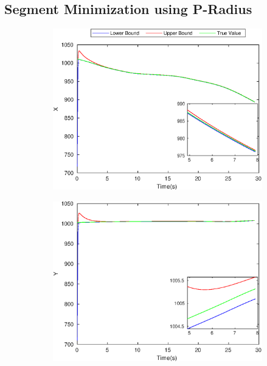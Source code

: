 \subsection{Segment Minimization using P-Radius}
\begin{figure}[h]
\begin{subfigure}{.5\linewidth}
\centering
\includegraphics[width=\linewidth]{figures/Prad/s3cvpradX}
\end{subfigure}
\begin{subfigure}{.5\linewidth}
\centering
\includegraphics[width=\linewidth]{figures/Prad/s3cvpradY}
\end{subfigure}
\begin{subfigure}{.5\linewidth}

\end{subfigure}
\end{figure}
